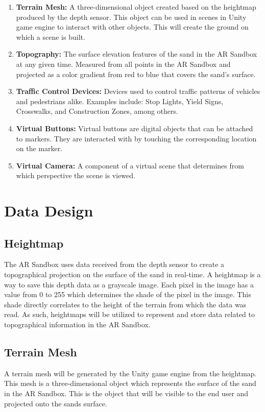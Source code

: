 \documentclass[letterpaper, 10pt, onecolumn, draftclsnofoot]{IEEEtran}
\begin{document}
\begin{enumerate}[label=]
        \item \textbf{Terrain Mesh:} A three-dimensional object created based on the heightmap produced by the depth sensor. This object can be used in scenes in Unity game engine to interact with other objects. This will create the ground on which a scene is built. 
        
        \item {\textbf{Topography:} The surface elevation features of the sand in the AR Sandbox at any given time. Measured from all points in the AR Sandbox and projected as a color gradient from red to blue that covers the sand's surface.}
        
        \item \textbf{Traffic Control Devices:} Devices used to control traffic patterns of vehicles and pedestrians alike. Examples include: Stop Lights, Yield Signs, Crosswalks, and Construction Zones, among others.
        
        \item {\textbf{Virtual Buttons:} Virtual buttons are digital objects that can be attached to markers. They are interacted with by touching the corresponding location on the marker.} 
        
        \item \textbf{Virtual Camera:} A component of a virtual scene that determines from which perspective the scene is viewed.
        
    \end{enumerate}

\section{Data Design}
    \subsection{Heightmap}
        The AR Sandbox uses data received from the depth sensor to create a topographical projection on the surface of the sand in real-time. A heightmap is a way to save this depth data as a grayscale image. Each pixel in the image has a value from 0 to 255 which determines the shade of the pixel in the image. This shade directly correlates to the height of the terrain from which the data was read. As such, heightmaps will be utilized to represent and store data related to topographical information in the AR Sandbox.  
    \subsection{Terrain Mesh}
        A terrain mesh will be generated by the Unity game engine from the heightmap. This mesh is a three-dimensional object which represents the surface of the sand in the AR Sandbox. This is the object that will be visible to the end user and projected onto the sands surface.  
\end{document}
